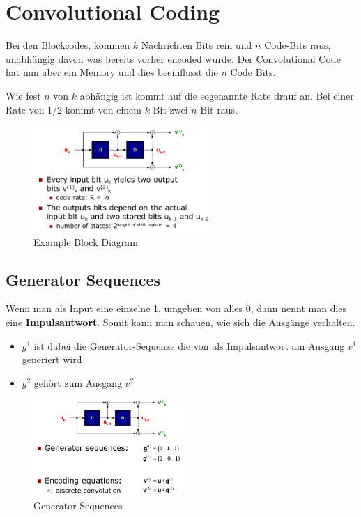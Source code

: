 \hypertarget{convolutional-coding}{%
\section{Convolutional Coding}\label{convolutional-coding}}

Bei den Blockcodes, kommen $k$ Nachrichten Bits rein und $n$ Code-Bits raus,
unabhängig davon was bereits vorher encoded wurde. Der Convolutional
Code hat nun aber ein Memory und dies beeinflusst die $n$ Code Bits.

Wie fest $n$ von $k$ abhängig ist kommt auf die sogenannte Rate drauf an.
Bei einer Rate von 1/2 kommt von einem $k$ Bit zwei $n$ Bit raus.

\begin{figure}[H]
\centering
\includegraphics[width=0.6\textwidth]{figures/convolutional_example.png}
\caption{Example Block Diagram}
\end{figure}

\hypertarget{generator-sequences}{%
\subsection{Generator Sequences}\label{generator-sequences}}

Wenn man als Input eine einzelne 1, umgeben von alles 0, dann nennt man
dies eine \textbf{Impulsantwort}. Somit kann man schauen, wie sich die Ausgänge
verhalten.

\begin{itemize}
\tightlist
\item
  $g^1$ ist dabei die Generator-Sequenze die von als Impulsantwort am
  Ausgang $v^1$ generiert wird
\item
  $g^2$ gehört zum Ausgang $v^2$
\end{itemize}

\begin{figure}[H]
\centering
\includegraphics[width=0.5\textwidth]{figures/generator_sequences.png}
\caption{Generator Sequences}
\end{figure}

